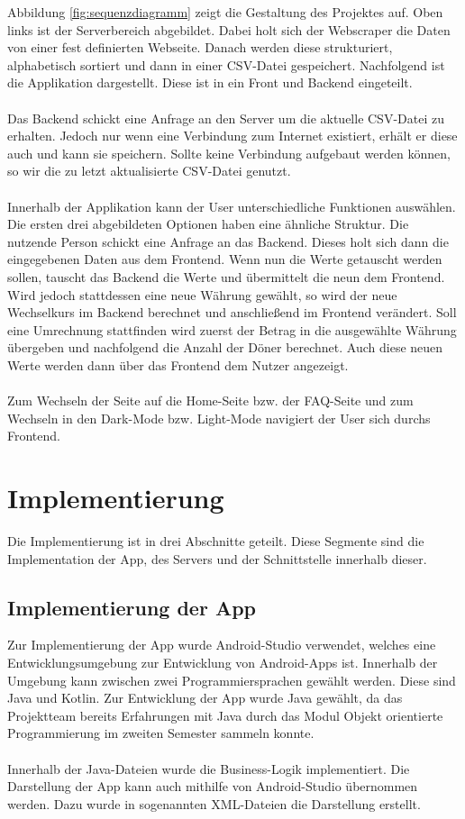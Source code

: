 \documentclass[conference]{IEEEtran}
\begin{document}
\noindent
Abbildung \ref{fig:sequenzdiagramm} zeigt die Gestaltung des Projektes auf. Oben links ist der Serverbereich abgebildet. Dabei holt sich der Webscraper die Daten von einer fest definierten Webseite. Danach werden diese strukturiert, alphabetisch sortiert und dann in einer CSV-Datei gespeichert. Nachfolgend ist die Applikation dargestellt. Diese ist in ein Front und Backend eingeteilt. \\\\
Das Backend schickt eine Anfrage an den Server um die aktuelle CSV-Datei zu erhalten. Jedoch nur wenn eine Verbindung zum Internet existiert, erhält er diese auch und kann sie speichern. Sollte keine Verbindung aufgebaut werden können, so wir die zu letzt aktualisierte CSV-Datei genutzt. \\\\
Innerhalb der Applikation kann der User unterschiedliche Funktionen auswählen. Die ersten drei abgebildeten Optionen haben eine ähnliche Struktur. Die nutzende Person schickt eine Anfrage an das Backend. Dieses holt sich dann die eingegebenen Daten aus dem Frontend. Wenn nun die Werte getauscht werden sollen, tauscht das Backend die Werte und übermittelt die neun dem Frontend. Wird jedoch stattdessen eine neue Währung gewählt, so wird der neue Wechselkurs im Backend berechnet und anschließend im Frontend verändert. Soll eine Umrechnung stattfinden wird zuerst der Betrag in die ausgewählte Währung übergeben und nachfolgend die Anzahl der Döner berechnet. Auch diese neuen Werte werden dann über das Frontend dem Nutzer angezeigt. \\\\
Zum Wechseln der Seite auf die Home-Seite bzw. der FAQ-Seite und zum Wechseln in den Dark-Mode bzw. Light-Mode navigiert der User sich durchs Frontend.

\section{Implementierung}
Die Implementierung ist in drei Abschnitte geteilt. Diese Segmente sind die Implementation der App, des Servers und der Schnittstelle innerhalb dieser.

\subsection{Implementierung der App}
Zur Implementierung der App wurde Android-Studio verwendet, welches eine Entwicklungsumgebung zur Entwicklung von Android-Apps ist. Innerhalb der Umgebung kann zwischen zwei Programmiersprachen gewählt werden. Diese sind Java und Kotlin. Zur Entwicklung der App wurde Java gewählt, da das Projektteam bereits Erfahrungen mit Java  durch das Modul Objekt orientierte Programmierung im zweiten Semester sammeln konnte. \\\\ Innerhalb der Java-Dateien wurde die Business-Logik implementiert. Die Darstellung der App kann auch mithilfe von Android-Studio übernommen werden. Dazu wurde in sogenannten XML-Dateien die Darstellung erstellt.
\end{document}
